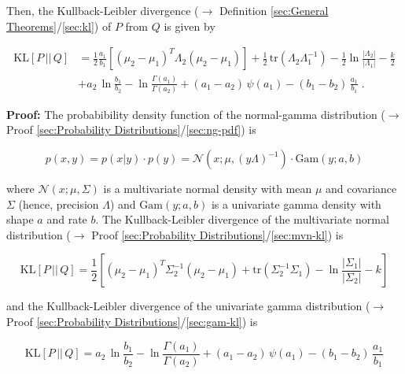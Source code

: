 \documentclass[a4paper,12pt,twoside]{book}
\begin{document}
Then, the Kullback-Leibler divergence ($\rightarrow$ Definition \ref{sec:General Theorems}/\ref{sec:kl}) of $P$ from $Q$ is given by

\begin{equation} \label{eq:ng-kl-NG-KL}
\begin{split}
\mathrm{KL}[P\,||\,Q] &= \frac{1}{2} \frac{a_1}{b_1} \left[ (\mu_2 - \mu_1)^T \Lambda_2 (\mu_2 - \mu_1) \right] + \frac{1}{2} \, \mathrm{tr}(\Lambda_2 \Lambda_1^{-1}) - \frac{1}{2} \ln \frac{|\Lambda_2|}{|\Lambda_1|} - \frac{k}{2} \\
&+ a_2 \, \ln \frac{b_1}{b_2} - \ln \frac{\Gamma(a_1)}{\Gamma(a_2)} + (a_1 - a_2) \, \psi(a_1) - (b_1 - b_2) \, \frac{a_1}{b_1} \; .
\end{split}
\end{equation}


\vspace{1em}
\textbf{Proof:} The probabibility density function of the normal-gamma distribution ($\rightarrow$ Proof \ref{sec:Probability Distributions}/\ref{sec:ng-pdf}) is

\begin{equation} \label{eq:ng-kl-NG-pdf}
p(x,y) = p(x|y) \cdot p(y) = \mathcal{N}(x; \mu, (y \Lambda)^{-1}) \cdot \mathrm{Gam}(y; a, b)
\end{equation}

where $\mathcal{N}(x; \mu, \Sigma)$ is a multivariate normal density with mean $\mu$ and covariance $\Sigma$ (hence, precision $\Lambda$) and $\mathrm{Gam}(y; a, b)$ is a univariate gamma density with shape $a$ and rate $b$. The Kullback-Leibler divergence of the multivariate normal distribution ($\rightarrow$ Proof \ref{sec:Probability Distributions}/\ref{sec:mvn-kl}) is

\begin{equation} \label{eq:ng-kl-mvn-KL}
\mathrm{KL}[P\,||\,Q] = \frac{1}{2} \left[ (\mu_2 - \mu_1)^T \Sigma_2^{-1} (\mu_2 - \mu_1) + \mathrm{tr}(\Sigma_2^{-1} \Sigma_1) - \ln \frac{|\Sigma_1|}{|\Sigma_2|} - k \right]
\end{equation}

and the Kullback-Leibler divergence of the univariate gamma distribution ($\rightarrow$ Proof \ref{sec:Probability Distributions}/\ref{sec:gam-kl}) is

\begin{equation} \label{eq:ng-kl-gam-KL}
\mathrm{KL}[P\,||\,Q] = a_2 \, \ln \frac{b_1}{b_2} - \ln \frac{\Gamma(a_1)}{\Gamma(a_2)} + (a_1 - a_2) \, \psi(a_1) - (b_1 - b_2) \, \frac{a_1}{b_1}
\end{equation}
\end{document}
